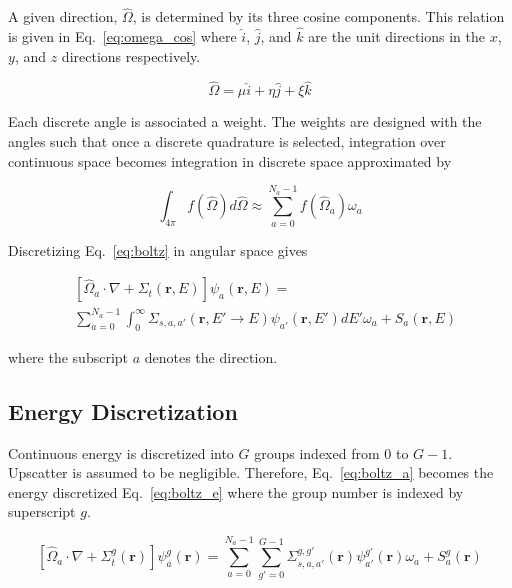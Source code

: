 A given direction, $\hat{\Omega}$, is determined by its three cosine components. This relation is given in Eq.~\ref{eq:omega_cos} where $\hat{i}$, $\hat{j}$, and $\hat{k}$ are the unit directions in the $x$, $y$, and $z$ directions respectively.

\begin{equation} \label{eq:omega_cos}
\hat{\Omega} = \mu \hat{i} + \eta \hat{j} + \xi \hat{k}
\end{equation}

Each discrete angle is associated a weight. The weights are designed with the angles such that once a discrete quadrature is selected, integration over continuous space becomes integration in discrete space approximated by

\begin{equation} \label{eq:disc_int}
\int_{4 \pi} f(\hat{\Omega}) d\hat{\Omega} \approx \sum_{a=0}^{N_a-1} f(\hat{\Omega}_a) \omega_a
\end{equation}

Discretizing Eq.~\ref{eq:boltz} in angular space gives

\begin{equation} \label{eq:boltz_a}
\begin{split}
&\left[ \hat{\Omega}_a \cdot \nabla + \Sigma_t(\boldsymbol{r}, E) \right]
\psi_{a}(\boldsymbol{r}, E) = \\
&\sum_{a=0}^{N_a-1} \int_0^\infty \Sigma_{s, a, a'}(\boldsymbol{r}, E' \rightarrow E) \psi_{a'}(\boldsymbol{r}, E') dE' \omega_a + S_a(\boldsymbol{r}, E)
\end{split}
\end{equation}

\noindent
where the subscript $a$ denotes the direction.

\subsection{Energy Discretization}

Continuous energy is discretized into $G$ groups indexed from 0 to $G-1$. Upscatter is assumed to be negligible. Therefore, Eq.~\ref{eq:boltz_a} becomes the energy discretized Eq.~\ref{eq:boltz_e} where the group number is indexed by superscript $g$.

\begin{equation} \label{eq:boltz_e}
\left[ \hat{\Omega}_a \cdot \nabla + \Sigma_t^g(\boldsymbol{r}) \right]
\psi_{a}^{g}(\boldsymbol{r}) = 
\sum_{a=0}^{N_a-1} \sum_{g'=0}^{G-1} \Sigma_{s, a, a'}^{g, g'}(\boldsymbol{r}) \psi_{a'}^{g'}(\boldsymbol{r}) \omega_a + S_a^g(\boldsymbol{r})
\end{equation}


